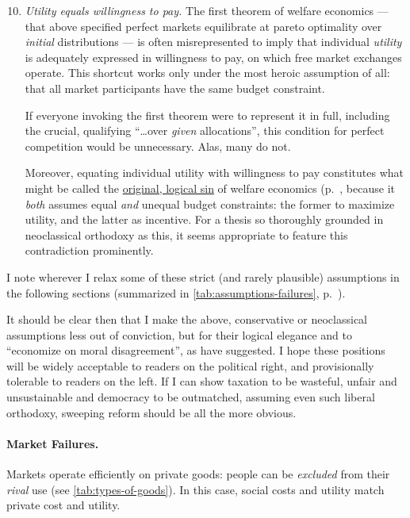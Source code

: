 \begin{enumerate}\setcounter{enumi}{9}
	\item \emph{Utility equals willingness to pay.}
	\label{itm:same-budgets}
	The first theorem of welfare economics --- that above specified perfect markets equilibrate at pareto optimality over \emph{initial} distributions --- is often misrepresented to imply that individual \emph{utility} is adequately expressed in willingness to pay, on which free market exchanges operate.
	This shortcut works only under the most heroic assumption of all:
	that all market participants have the same budget constraint.

	If everyone invoking the first theorem were to represent it in full, including the crucial, qualifying ``\ldots over \emph{given} allocations'', this condition for perfect competition would be unnecessary.
	Alas, many do not.

	Moreover, equating individual utility with willingness to pay constitutes what might be called the \hyperref[sec:different-budget-constraints]{original, logical sin} of welfare economics (p.~\pageref{sec:different-budget-constraints}, because it \emph{both} assumes equal \emph{and} unequal budget constraints:
	the former to maximize utility, and the latter as incentive.
	For a thesis so thoroughly grounded in neoclassical orthodoxy as this, it seems appropriate to feature this contradiction prominently.
\end{enumerate}

I note wherever I relax some of these strict (and rarely plausible) assumptions in the following sections (summarized in \autoref{tab:assumptions-failures}, p.~\pageref{tab:assumptions-failures}).

It should be clear then that I make the above, conservative or neoclassical assumptions less out of conviction, but for their logical elegance and to ``economize on moral disagreement'', as \cite[K226]{GutmannThompson-2004-aa} have suggested.
I hope these positions will be widely acceptable to readers on the political right, and provisionally tolerable to readers on the left.
If I can show taxation to be wasteful, unfair and unsustainable and democracy to be outmatched, assuming even such liberal orthodoxy, sweeping reform should be all the more obvious.



\paragraph{Market Failures.}
	\label{sec:market-failures}
Markets operate efficiently on private goods:
people can be \emph{excluded} from their \emph{rival} use (see \autoref{tab:types-of-goods}).
In this case, social costs and utility match private cost and utility.

